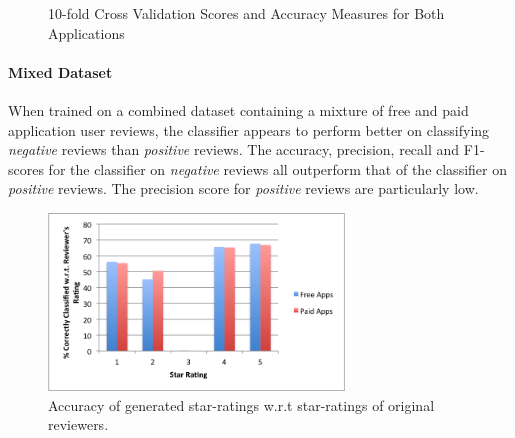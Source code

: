 \documentclass[11pt]{report} %
\begin{document}
\begin{figure}[h!]
\centering
{}
\caption[Optional caption for list of figures]{10-fold Cross Validation Scores and Accuracy Measures for Both Applications}
\label{fig:subfigureExample}
\end{figure}

\paragraph{Mixed Dataset} When trained on a combined dataset containing a mixture of free and paid application user reviews, the classifier appears to perform better on classifying \textit{negative} reviews than \textit{positive} reviews. The accuracy, precision, recall and F1-scores for the classifier on \textit{negative} reviews all outperform that of the classifier on \textit{positive} reviews. The precision score for \textit{positive} reviews are particularly low.

\begin{figure}[H]
	\centering
	\includegraphics[width=0.7\textwidth]{data/pmi-cue-acc-wsvm.png}
	\caption{Accuracy of generated star-ratings w.r.t star-ratings of original reviewers.}
	\label{fig:pmi-cue-wsvm-acc}
	\end{figure}
\end{document}
